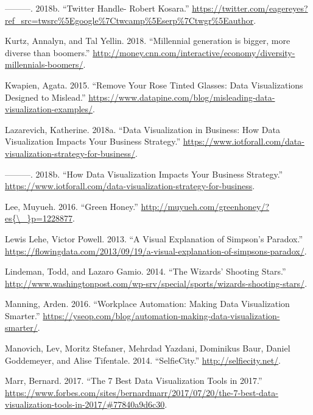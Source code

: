 \documentclass[]{book}
\begin{document}
\hypertarget{ref-twitter_Kosara}{}
---------. 2018b. ``Twitter Handle- Robert Kosara.''
\url{https://twitter.com/eagereyes?ref_src=twsrc\%5Egoogle\%7Ctwcamp\%5Eserp\%7Ctwgr\%5Eauthor}.

\hypertarget{ref-age_groups}{}
Kurtz, Annalyn, and Tal Yellin. 2018. ``Millennial generation is bigger,
more diverse than boomers.''
\url{http://money.cnn.com/interactive/economy/diversity-millennials-boomers/}.

\hypertarget{ref-misleading_data}{}
Kwapien, Agata. 2015. ``Remove Your Rose Tinted Glasses: Data
Visualizations Designed to Mislead.''
\url{https://www.datapine.com/blog/misleading-data-visualization-examples/}.

\hypertarget{ref-strategy_impact}{}
Lazarevich, Katherine. 2018a. ``Data Visualization in Business: How Data
Visualization Impacts Your Business Strategy.''
\url{https://www.iotforall.com/data-visualization-strategy-for-business/}.

\hypertarget{ref-biz_strategy}{}
---------. 2018b. ``How Data Visualization Impacts Your Business
Strategy.''
\url{https://www.iotforall.com/data-visualization-strategy-for-business}.

\hypertarget{ref-green_honey}{}
Lee, Muyueh. 2016. ``Green Honey.''
\href{http://muyueh.com/greenhoney/?es\%7B/_\%7Dp=1228877}{http://muyueh.com/greenhoney/?es\{\textbackslash{}\_\}p=1228877}.

\hypertarget{ref-simpson_paradox}{}
Lewis Lehe, Victor Powell. 2013. ``A Visual Explanation of Simpson's
Paradox.''
\url{https://flowingdata.com/2013/09/19/a-visual-explanation-of-simpsons-paradox/}.

\hypertarget{ref-basketball}{}
Lindeman, Todd, and Lazaro Gamio. 2014. ``The Wizards' Shooting Stars.''
\url{http://www.washingtonpost.com/wp-srv/special/sports/wizards-shooting-stars/}.

\hypertarget{ref-work_place}{}
Manning, Arden. 2016. ``Workplace Automation: Making Data Visualization
Smarter.''
\url{https://yseop.com/blog/automation-making-data-visualization-smarter/}.

\hypertarget{ref-selfie}{}
Manovich, Lev, Moritz Stefaner, Mehrdad Yazdani, Dominikus Baur, Daniel
Goddemeyer, and Alise Tifentale. 2014. ``SelfieCity.''
\url{http://selfiecity.net/}.

\hypertarget{ref-7_best_tools}{}
Marr, Bernard. 2017. ``The 7 Best Data Visualization Tools in 2017.''
\url{https://www.forbes.com/sites/bernardmarr/2017/07/20/the-7-best-data-visualization-tools-in-2017/\#77840a9d6c30}.
\end{document}
